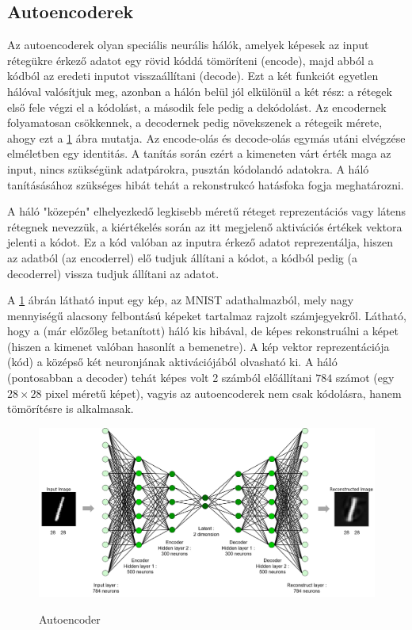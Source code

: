 \documentclass[12pt]{article}
\begin{document}
\subsection{Autoencoderek}

Az autoencoderek olyan speciális neurális hálók, amelyek képesek az input rétegükre érkező adatot egy rövid kóddá tömöríteni (encode), majd abból a kódból az eredeti inputot visszaállítani (decode). Ezt a két funkciót egyetlen hálóval valósítjuk meg, azonban a hálón belül jól elkülönül a két rész: a rétegek első fele végzi el a kódolást, a második fele pedig a dekódolást. Az encodernek folyamatosan csökkennek, a decodernek pedig növekszenek a rétegeik mérete, ahogy ezt a \ref{AE_arch2} ábra mutatja. Az encode-olás és decode-olás egymás utáni elvégzése elméletben egy identitás. A tanítás során ezért a kimeneten várt érték maga az input, nincs szükségünk adatpárokra, pusztán kódolandó adatokra. A háló tanításásához szükséges hibát tehát a rekonstrukcó hatásfoka fogja meghatározni.

A háló "közepén" elhelyezkedő legkisebb méretű réteget reprezentációs vagy látens rétegnek nevezzük, a kiértékelés során az itt megjelenő aktivációs értékek vektora jelenti a kódot. Ez a kód valóban az inputra érkező adatot reprezentálja, hiszen az adatból (az encoderrel) elő tudjuk állítani a kódot, a kódból pedig (a decoderrel) vissza tudjuk állítani az adatot.

A \ref{AE_arch2} ábrán látható input egy kép, az MNIST adathalmazból, mely nagy mennyiségű alacsony felbontású képeket tartalmaz rajzolt számjegyekről. Látható, hogy a (már előzőleg betanított) háló kis hibával, de képes rekonstruálni a képet (hiszen a kimenet valóban hasonlít a bemenetre). A kép vektor reprezentációja (kód) a középső két neuronjának aktivációjából olvasható ki. A háló (pontosabban a decoder) tehát képes volt 2 számból előállítani $784$ számot (egy $28\times 28$ pixel méretű képet), vagyis az autoencoderek nem csak kódolásra, hanem tömörítésre is alkalmasak.

\begin{figure}[h!]
\begin{center}
  \label{AE_arch2}
  \includegraphics[width=\linewidth]{AE_arch2.png}
  \caption{Autoencoder}
\end{center}
\end{figure}
\end{document}
